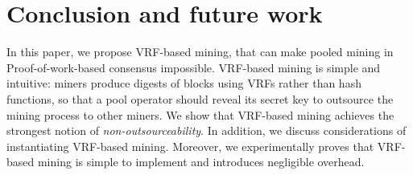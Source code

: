 \section{Conclusion and future work}
\label{sec:conclusion}

In this paper, we propose VRF-based mining, that can make pooled mining in Proof-of-work-based consensus impossible.
VRF-based mining is simple and intuitive: miners produce digests of blocks using VRFs rather than hash functions, so that a pool operator should reveal its secret key to outsource the mining process to other miners.
We show that VRF-based mining achieves the strongest notion of \emph{non-outsourceability}.
In addition, we discuss considerations of instantiating VRF-based mining.
Moreover, we experimentally proves that VRF-based mining is simple to implement and introduces negligible overhead.